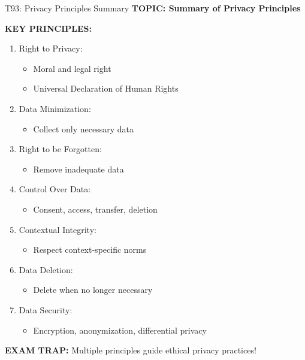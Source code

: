 \documentclass[8pt]{beamer}
\begin{document}
	\begin{frame}{T93: Privacy Principles Summary}
		\fontsize{6.5}{7.5}\selectfont
		\textbf{TOPIC: Summary of Privacy Principles}
		
		\vspace{0.1cm}
		\textbf{KEY PRINCIPLES:}
		\begin{enumerate}
			\item \textcolor{myblue}{Right to Privacy:}
			\begin{itemize}
				\item Moral and legal right
				\item Universal Declaration of Human Rights
			\end{itemize}
			\item \textcolor{myblue}{Data Minimization:}
			\begin{itemize}
				\item Collect only necessary data
			\end{itemize}
			\item \textcolor{myblue}{Right to be Forgotten:}
			\begin{itemize}
				\item Remove inadequate data
			\end{itemize}
			\item \textcolor{myblue}{Control Over Data:}
			\begin{itemize}
				\item Consent, access, transfer, deletion
			\end{itemize}
			\item \textcolor{myblue}{Contextual Integrity:}
			\begin{itemize}
				\item Respect context-specific norms
			\end{itemize}
			\item \textcolor{myblue}{Data Deletion:}
			\begin{itemize}
				\item Delete when no longer necessary
			\end{itemize}
			\item \textcolor{myblue}{Data Security:}
			\begin{itemize}
				\item Encryption, anonymization, differential privacy
			\end{itemize}
		\end{enumerate}
		
		\textcolor{myred}{\textbf{EXAM TRAP:}} Multiple principles guide \textcolor{myblue}{ethical privacy practices}!
	\end{frame}
	
\end{document}

